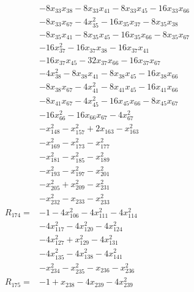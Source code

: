 \begin{align*}
&-8x_{33}x_{38} -8x_{33}x_{41} -8x_{33}x_{45} -16x_{33}x_{66}\\
&-8x_{33}x_{67} -4x_{35}^{2} -16x_{35}x_{37} -8x_{35}x_{38}\\
&-8x_{35}x_{41} -8x_{35}x_{45} -16x_{35}x_{66} -8x_{35}x_{67}\\
&-16x_{37}^{2} -16x_{37}x_{38} -16x_{37}x_{41}\\
&-16x_{37}x_{45} -32x_{37}x_{66} -16x_{37}x_{67}\\
&-4x_{38}^{2} -8x_{38}x_{41} -8x_{38}x_{45} -16x_{38}x_{66}\\
&-8x_{38}x_{67} -4x_{41}^{2} -8x_{41}x_{45} -16x_{41}x_{66}\\
&-8x_{41}x_{67} -4x_{45}^{2} -16x_{45}x_{66} -8x_{45}x_{67}\\
&-16x_{66}^{2} -16x_{66}x_{67} -4x_{67}^{2}\\
&-x_{148}^{2} -x_{157}^{2} +2x_{163} -x_{163}^{2}\\
&-x_{169}^{2} -x_{173}^{2} -x_{177}^{2}\\
&-x_{181}^{2} -x_{185}^{2} -x_{189}^{2}\\
&-x_{193}^{2} -x_{197}^{2} -x_{201}^{2}\\
&-x_{205}^{2} +x_{209}^{2} -x_{231}^{2}\\
&-x_{232}^{2} -x_{233} -x_{233}^{2}\\[3pt]
R_{174}={}&-1 -4x_{106}^{2} -4x_{111}^{2} -4x_{114}^{2}\\
&-4x_{117}^{2} -4x_{120}^{2} -4x_{124}^{2}\\
&-4x_{127}^{2} +x_{129}^{2} -4x_{131}^{2}\\
&-4x_{135}^{2} -4x_{138}^{2} -4x_{141}^{2}\\
&-x_{234}^{2} -x_{235}^{2} -x_{236} -x_{236}^{2}\\[3pt]
R_{175}={}&-1 +x_{238} -4x_{239} -4x_{239}^{2}\\[3pt]
\end{align*}
